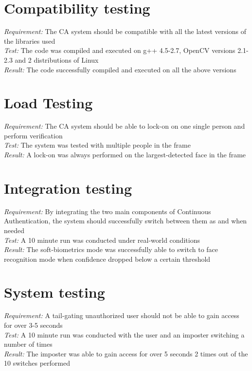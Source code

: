 \documentclass[12pt]{report}			%
\begin{document}
\section{ Compatibility testing }
\emph{ Requirement: } The CA system should be compatible with all the latest versions of the libraries used\\
\emph{ Test: } The code was compiled and executed on g++ 4.5-2.7, OpenCV versions 2.1-2.3 and 2 distributions of Linux\\
\emph{ Result: } The code successfully compiled and executed on all the above versions\\

\section{ Load Testing }
\emph{ Requirement: } The CA system should be able to lock-on on one single person and perform verification \\
\emph{ Test: } The system was tested with multiple people in the frame\\
\emph{ Result: } A lock-on was always performed on the largest-detected face in the frame\\

\section{ Integration testing}
\emph{ Requirement: } By integrating the two main components of Continuous Authentication, the system should successfully switch between them as and when needed\\
\emph{ Test: } A 10 minute run was conducted under real-world conditions\\
\emph{ Result: } The soft-biometrics mode was successfully able to switch to face recognition mode when confidence dropped below a certain threshold\\

\section{ System testing }
\emph{ Requirement: } A tail-gating unauthorized user should not be able to gain access for over 3-5 seconds\\
\emph{ Test: } A 10 minute run was conducted with the user and an imposter switching a number of times\\
\emph{ Result: } The imposter was able to gain access for over 5 seconds 2 times out of the 10 switches performed\\
\end{document}
